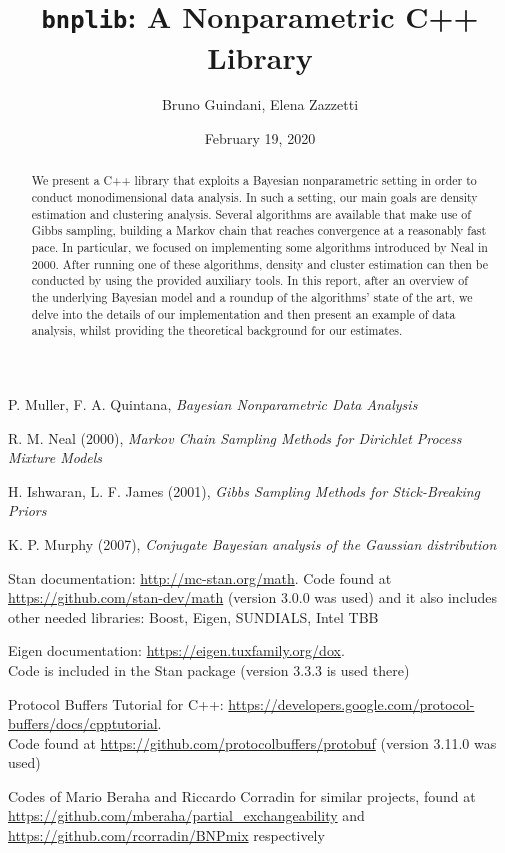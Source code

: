 \documentclass[a4paper]{article}
\title{\texttt{bnplib}: A Nonparametric C++ Library}
\author{Bruno Guindani, Elena Zazzetti}
\date{February 19, 2020}
\begin{document}
\maketitle

\begin{abstract}
We present a C++ library that exploits a Bayesian nonparametric setting in order to conduct monodimensional data analysis.
In such a setting, our main goals are density estimation and clustering analysis.
Several algorithms are available that make use of Gibbs sampling, building a Markov chain that reaches convergence at a reasonably fast pace.
In particular, we focused on implementing some algorithms introduced by Neal in 2000.
After running one of these algorithms, density and cluster estimation can then be conducted by using the provided auxiliary tools.
In this report, after an overview of the underlying Bayesian model and a roundup of the algorithms' state of the art, we delve into the details of our implementation and then present an example of data analysis, whilst providing the theoretical background for our estimates.
\end{abstract}





\begin{thebibliography}{9}
	 P. Muller, F. A. Quintana, \textit{Bayesian Nonparametric Data Analysis}
	
	 R. M. Neal (2000), \textit{Markov Chain Sampling Methods for Dirichlet Process Mixture Models}
	
	 H. Ishwaran, L. F. James (2001), \textit{Gibbs Sampling Methods for Stick-Breaking Priors}
	
	 K. P. Murphy (2007), \textit{Conjugate Bayesian analysis of the Gaussian distribution}
	
	 Stan documentation: \url{http://mc-stan.org/math}.
	Code found at \url{https://github.com/stan-dev/math} (version 3.0.0 was used) and it also includes other needed libraries: Boost, Eigen, SUNDIALS, Intel TBB
	
	 Eigen documentation: \url{https://eigen.tuxfamily.org/dox}. \\
	Code is included in the Stan package (version 3.3.3 is used there)
	
	 Protocol Buffers Tutorial for C++: \url{https://developers.google.com/protocol-buffers/docs/cpptutorial}. \\
	Code found at \url{https://github.com/protocolbuffers/protobuf} (version 3.11.0 was used)
	
	 Codes of Mario Beraha and Riccardo Corradin for similar projects, found at \url{https://github.com/mberaha/partial_exchangeability} and \url{https://github.com/rcorradin/BNPmix} respectively
\end{thebibliography}
\end{document}
